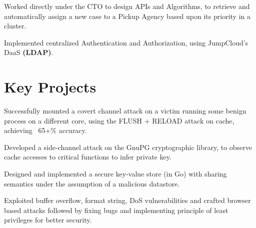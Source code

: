 \documentclass[a4paper]{deedy-resume-reversed}
\begin{document}
\begin{minipage}[t]{0.60\textwidth}
\begin{tightemize}
	\item Worked directly under the CTO to design APIs and Algorithms, to retrieve and automatically assign a new case to a Pickup Agency based upon its priority in a cluster.
    \item Implemented centralized Authentication and Authorization, using JumpCloud’s DaaS \textbf{(LDAP)}.
\end{tightemize}
\sectionsep


\section{Key Projects}
\descript{  }
\begin{tightemize}
        \item Successfully mounted a covert channel attack on a victim running some benign process on a different core, using the FLUSH + RELOAD attack on cache, achieving ~65+\% accuracy.
        \item Developed a side-channel attack on the GnuPG cryptographic library, to observe cache accesses to critical functions to infer private key.
\end{tightemize}
\sectionsep

\begin{tightemize}
    \item Designed and implemented a secure key-value store (in Go) with sharing semantics under the assumption of a malicious datastore.
\end{tightemize}
\sectionsep

\descript{}
\begin{tightemize}
    \item Exploited buffer overflow, format string, DoS vulnerabilities and crafted browser based attacks followed by fixing bugs and implementing principle of least privileges for better security.
\end{tightemize}
\sectionsep


\end{minipage}
\end{document}
